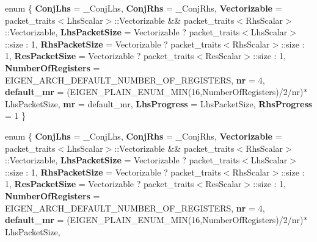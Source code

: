 \begin{DoxyCompactItemize}
\item 
\mbox{\label{class_eigen_1_1internal_1_1gebp__traits_a97046c179216306a8f6e304493f2cbe0}} 
enum \{ \newline
{\bfseries Conj\+Lhs} = \+\_\+\+Conj\+Lhs, 
{\bfseries Conj\+Rhs} = \+\_\+\+Conj\+Rhs, 
{\bfseries Vectorizable} = packet\+\_\+traits$<$Lhs\+Scalar$>$\+:\+:Vectorizable \&\& packet\+\_\+traits$<$Rhs\+Scalar$>$\+:\+:Vectorizable, 
{\bfseries Lhs\+Packet\+Size} = Vectorizable ? packet\+\_\+traits$<$Lhs\+Scalar$>$\+:\+:size \+: 1, 
\newline
{\bfseries Rhs\+Packet\+Size} = Vectorizable ? packet\+\_\+traits$<$Rhs\+Scalar$>$\+:\+:size \+: 1, 
{\bfseries Res\+Packet\+Size} = Vectorizable ? packet\+\_\+traits$<$Res\+Scalar$>$\+:\+:size \+: 1, 
{\bfseries Number\+Of\+Registers} = E\+I\+G\+E\+N\+\_\+\+A\+R\+C\+H\+\_\+\+D\+E\+F\+A\+U\+L\+T\+\_\+\+N\+U\+M\+B\+E\+R\+\_\+\+O\+F\+\_\+\+R\+E\+G\+I\+S\+T\+E\+RS, 
{\bfseries nr} = 4, 
\newline
{\bfseries default\+\_\+mr} = (E\+I\+G\+E\+N\+\_\+\+P\+L\+A\+I\+N\+\_\+\+E\+N\+U\+M\+\_\+\+M\+IN(16,Number\+Of\+Registers)/2/nr)$\ast$\+Lhs\+Packet\+Size, 
{\bfseries mr} = default\+\_\+mr, 
{\bfseries Lhs\+Progress} = Lhs\+Packet\+Size, 
{\bfseries Rhs\+Progress} = 1
 \}
\item 
\mbox{\label{class_eigen_1_1internal_1_1gebp__traits_a941ec02046388bbe3ac80fd46464acde}} 
enum \{ \newline
{\bfseries Conj\+Lhs} = \+\_\+\+Conj\+Lhs, 
{\bfseries Conj\+Rhs} = \+\_\+\+Conj\+Rhs, 
{\bfseries Vectorizable} = packet\+\_\+traits$<$Lhs\+Scalar$>$\+:\+:Vectorizable \&\& packet\+\_\+traits$<$Rhs\+Scalar$>$\+:\+:Vectorizable, 
{\bfseries Lhs\+Packet\+Size} = Vectorizable ? packet\+\_\+traits$<$Lhs\+Scalar$>$\+:\+:size \+: 1, 
\newline
{\bfseries Rhs\+Packet\+Size} = Vectorizable ? packet\+\_\+traits$<$Rhs\+Scalar$>$\+:\+:size \+: 1, 
{\bfseries Res\+Packet\+Size} = Vectorizable ? packet\+\_\+traits$<$Res\+Scalar$>$\+:\+:size \+: 1, 
{\bfseries Number\+Of\+Registers} = E\+I\+G\+E\+N\+\_\+\+A\+R\+C\+H\+\_\+\+D\+E\+F\+A\+U\+L\+T\+\_\+\+N\+U\+M\+B\+E\+R\+\_\+\+O\+F\+\_\+\+R\+E\+G\+I\+S\+T\+E\+RS, 
{\bfseries nr} = 4, 
\newline
{\bfseries default\+\_\+mr} = (E\+I\+G\+E\+N\+\_\+\+P\+L\+A\+I\+N\+\_\+\+E\+N\+U\+M\+\_\+\+M\+IN(16,Number\+Of\+Registers)/2/nr)$\ast$\+Lhs\+Packet\+Size, 

\end{DoxyCompactItemize}
